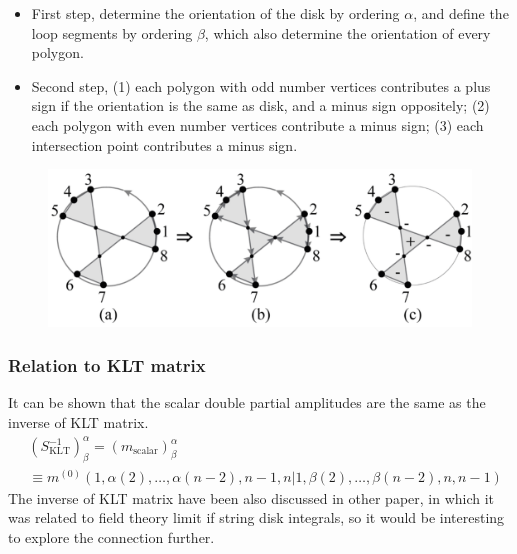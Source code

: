 \documentclass{beamer}
\begin{document}
\begin{frame}
    \begin{itemize}
        \item First step, determine the orientation of the disk by ordering $\alpha$, and define the loop segments by ordering $\beta$, which also determine the orientation of every polygon.
        \item Second step, (1) each polygon with odd number vertices contributes a plus sign if the orientation is the same as disk, and a minus sign oppositely;
              (2) each polygon with even number vertices contribute a minus sign; (3) each intersection point contributes a minus sign.
    \end{itemize}
    \begin{figure}
        \centering
        \includegraphics[width=1\linewidth]{6.png}
    \end{figure}
\end{frame}
\begin{frame}
    \frametitle{Relation to KLT matrix}
    It can be shown that the scalar double partial amplitudes are the same as the inverse of KLT matrix.
    \begin{align*}
        &(S_{\mathrm{KLT}}^{-1})_\beta^\alpha=(m_{\mathrm{scalar}})_\beta^\alpha\\
        &\equiv m^{(0)}(1,\alpha(2),\ldots,\alpha(n-2),n-1,n|1,\beta(2),\ldots,\beta(n-2),n,n-1)
    \end{align*}
    The inverse of KLT matrix have been also discussed in other paper, in which it was related to field theory limit if string 
    disk integrals, so it would be interesting to explore the connection further. 
\end{frame}
\end{document}
